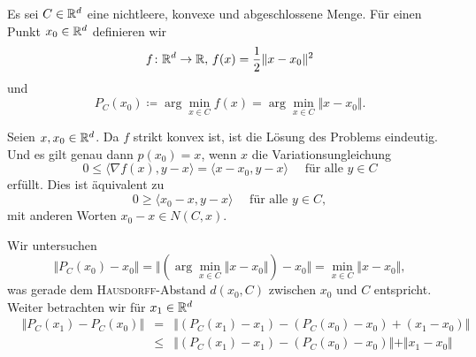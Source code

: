
Es sei $C\in\mathbb{R}^d$ eine nichtleere, konvexe und abgeschlossene Menge. Für einen Punkt $x_0\in\mathbb{R}^d$ definieren wir
\begin{displaymath}
 f\colon \mathbb{R}^d\to\mathbb{R},\, f(x)=\frac{1}{2}\Vert x-x_0\Vert^2
\end{displaymath}
und
\begin{displaymath}
 P_C(x_0)\coloneqq \arg\min_{x\in C}f(x)=\arg\min_{x\in C}\Vert x-x_0\Vert.
\end{displaymath}
\begin{compactenum}[(i)]
 \item Seien $x,x_0\in \mathbb{R}^d$. Da $f$ strikt konvex ist, ist die Lösung des Problems eindeutig.
 Und es gilt genau dann $p(x_0)=x$, wenn $x$ die Variationsungleichung
 \begin{displaymath}
  0\leq \langle \nabla f(x),y-x\rangle=\langle x-x_0,y-x\rangle \quad\text{ für alle }y\in C
 \end{displaymath} erfüllt.
 Dies ist äquivalent zu
 \begin{displaymath}
  0\geq \langle x_0-x,y-x\rangle \quad\text{ für alle }y\in C,
 \end{displaymath}
 mit anderen Worten $x_0-x\in N(C,x)$.
 \\
 \item Wir untersuchen
 \begin{displaymath}
  \Vert P_C(x_0)-x_0\Vert=\Vert (\arg\min_{x\in C}\Vert x-x_0\Vert)-x_0\Vert =\min_{x\in C}\Vert x-x_0\Vert,
 \end{displaymath}
 was gerade dem \textsc{Hausdorff}-Abstand $d(x_0,C)$ zwischen $x_0$ und $C$ entspricht.
 Weiter betrachten wir für $x_1\in \mathbb{R}^d$
 \begin{align*}
  &\Vert P_C(x_1)-P_C(x_0)\Vert&=&\Vert (P_C(x_1)-x_1)-(P_C(x_0)-x_0)+(x_1-x_0)\Vert\\
  &&\leq& \Vert (P_C(x_1)-x_1)-(P_C(x_0)-x_0)\Vert+\Vert x_1-x_0\Vert
 \end{align*}

\end{compactenum}


